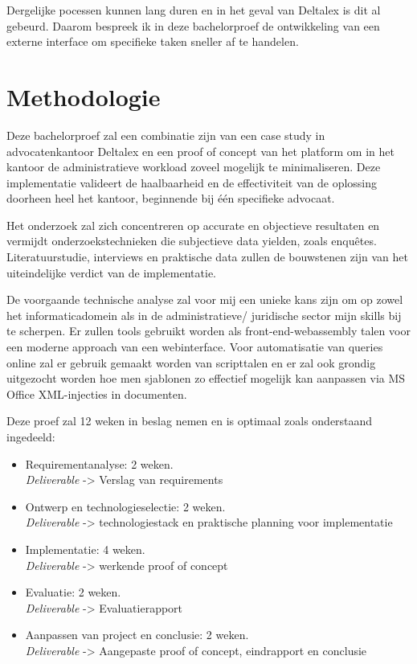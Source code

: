 Dergelijke pocessen kunnen lang duren en in het geval van Deltalex is dit al gebeurd. Daarom bespreek ik in deze bachelorproef de ontwikkeling van een externe interface om specifieke taken sneller af te handelen.

\section{Methodologie}%
\label{sec:methodologie}
Deze bachelorproef zal een combinatie zijn van een case study in advocatenkantoor Deltalex en een proof of concept van het platform om in het kantoor de administratieve workload zoveel mogelijk te minimaliseren. Deze implementatie valideert de haalbaarheid en de effectiviteit van de oplossing doorheen heel het kantoor, beginnende bij één specifieke advocaat. 

Het onderzoek zal zich concentreren op accurate en objectieve resultaten en vermijdt onderzoekstechnieken die subjectieve data yielden, zoals enquêtes. Literatuurstudie, interviews en praktische data zullen de bouwstenen zijn van het uiteindelijke verdict van de implementatie. 

De voorgaande technische analyse zal voor mij een unieke kans zijn om op zowel het informaticadomein als in de administratieve/ juridische sector mijn skills bij te scherpen. Er zullen tools gebruikt worden als front-end-webassembly talen voor een moderne approach van een webinterface. Voor automatisatie van queries online zal er gebruik gemaakt worden van scripttalen en er zal ook grondig uitgezocht worden hoe men sjablonen zo effectief mogelijk kan aanpassen via MS Office XML-injecties in documenten. 

Deze proef zal 12 weken in beslag nemen en is optimaal zoals onderstaand ingedeeld:
\begin{itemize}
        \item Requirementanalyse: 2 weken.\\ \emph{Deliverable} -> Verslag van requirements
        \item Ontwerp en technologieselectie: 2 weken.\\ \emph{Deliverable} -> technologiestack en praktische planning voor implementatie
        \item Implementatie: 4 weken.\\ \emph{Deliverable} -> werkende proof of concept
        \item Evaluatie: 2 weken. \\ \emph{Deliverable} -> Evaluatierapport
        \item Aanpassen van project en conclusie: 2 weken.\\ \emph{Deliverable} -> Aangepaste proof of concept, eindrapport en conclusie
\end{itemize}

